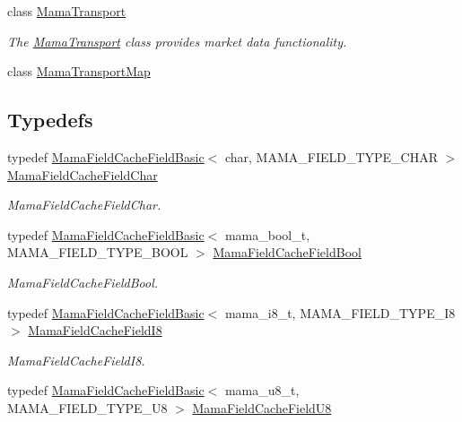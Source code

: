 \begin{DoxyCompactItemize}
class \hyperlink{classWombat_1_1MamaTransport}{MamaTransport}
\begin{DoxyCompactList}\small\item\em The \hyperlink{classWombat_1_1MamaTransport}{MamaTransport} class provides market data functionality. \item\end{DoxyCompactList}\item 
class \hyperlink{classWombat_1_1MamaTransportMap}{MamaTransportMap}
\end{DoxyCompactItemize}
\subsection*{Typedefs}
\begin{DoxyCompactItemize}
\item 
typedef \hyperlink{classWombat_1_1MamaFieldCacheFieldBasic}{MamaFieldCacheFieldBasic}$<$ char, MAMA\_\-FIELD\_\-TYPE\_\-CHAR $>$ \hyperlink{namespaceWombat_afc2d1a3ad124600d17c392fddac87751}{MamaFieldCacheFieldChar}
\begin{DoxyCompactList}\small\item\em MamaFieldCacheFieldChar. \item\end{DoxyCompactList}\item 
typedef \hyperlink{classWombat_1_1MamaFieldCacheFieldBasic}{MamaFieldCacheFieldBasic}$<$ mama\_\-bool\_\-t, MAMA\_\-FIELD\_\-TYPE\_\-BOOL $>$ \hyperlink{namespaceWombat_a3221e78548dcebb66e0dd62cccf5d523}{MamaFieldCacheFieldBool}
\begin{DoxyCompactList}\small\item\em MamaFieldCacheFieldBool. \item\end{DoxyCompactList}\item 
typedef \hyperlink{classWombat_1_1MamaFieldCacheFieldBasic}{MamaFieldCacheFieldBasic}$<$ mama\_\-i8\_\-t, MAMA\_\-FIELD\_\-TYPE\_\-I8 $>$ \hyperlink{namespaceWombat_a0d3967caf47e313155334a4834ecf74c}{MamaFieldCacheFieldI8}
\begin{DoxyCompactList}\small\item\em MamaFieldCacheFieldI8. \item\end{DoxyCompactList}\item 
typedef \hyperlink{classWombat_1_1MamaFieldCacheFieldBasic}{MamaFieldCacheFieldBasic}$<$ mama\_\-u8\_\-t, MAMA\_\-FIELD\_\-TYPE\_\-U8 $>$ \hyperlink{namespaceWombat_a05c15419f040976fdb0d3566bee3a391}{MamaFieldCacheFieldU8}

\end{DoxyCompactItemize}
